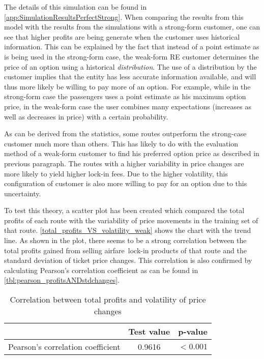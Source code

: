 The details of this simulation can be found in \autoref{app:SimulationResultsPerfectStrong}. When comparing the results from this model with the results from the simulations with a strong-form customer, one can see that higher profits are being generate when the customer uses historical information. This can be explained by the fact that instead of a point estimate as is being used in the strong-form case, the weak-form RE customer determines the price of an option using a historical \emph{distribution}. The use of a distribution by the customer implies that the entity has less accurate information available, and will thus more likely be willing to pay more of an option. For example, while in the strong-form case the passengers uses a point estimate as his maximum option price, in the weak-form case the user combines many expectations (increases as well as decreases in price) with a certain probability.

As can be derived from the statistics, some routes outperform the strong-case customer much more than others. This has likely to do with the evaluation method of a weak-form customer to find his preferred option price as described in previous paragraph. The routes with a higher variability in price changes are more likely to yield higher lock-in fees. Due to the higher volatility, this configuration of customer is also more willing to pay for an option due to this uncertainty.

To test this theory, a scatter plot has been created which compared the total profits of each route with the variability of price movements in the training set of that route. \autoref{total_profits_VS_volatility_weak} shows the chart with the trend line. As shown in the plot, there seems to be a strong correlation between the total profits gained from selling airfare~lock-in products of that route and the standard deviation of ticket price changes. This correlation is also confirmed by calculating Pearson's correlation coefficient as can be found in \autoref{tbl:pearson_profitsANDstdchanges}.


\begin{table}
\centering
\begin{tabular}{l c c}
\toprule
~  &  Test value  &  p-value  \\
\midrule
Pearson's correlation coefficient   &  0.9616  &  $< 0.001$ \\
\bottomrule
\end{tabular}
\caption{Correlation between total profits and volatility of price changes}
\label{tbl:pearson_profitsANDstdchanges}
\end{table}


